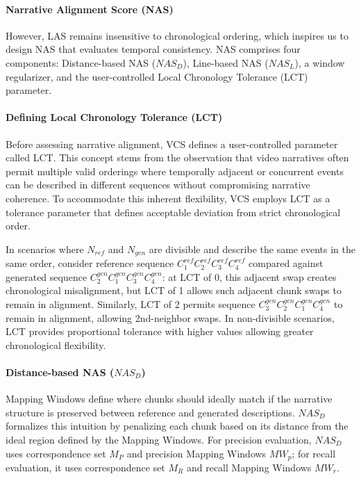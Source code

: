 \documentclass[letterpaper]{article} %
\begin{document}
\paragraph{Narrative Alignment Score (NAS)}
However, LAS remains insensitive to chronological ordering, which inspires us to design NAS that evaluates temporal consistency. NAS comprises four components: Distance-based NAS ($NAS_D$), Line-based NAS ($NAS_L$), a window regularizer, and the user-controlled Local Chronology Tolerance (LCT) parameter.

\paragraph{Defining Local Chronology Tolerance (LCT)}
Before assessing narrative alignment, VCS defines a user-controlled parameter called LCT. This concept stems from the observation that video narratives often permit multiple valid orderings where temporally adjacent or concurrent events can be described in different sequences without compromising narrative coherence. To accommodate this inherent flexibility, VCS employs LCT as a tolerance parameter that defines acceptable deviation from strict chronological order. 

In scenarios where $N_{ref}$ and $N_{gen}$ are divisible and describe the same events in the same order, consider reference sequence $C_1^{ref}C_2^{ref}C_3^{ref}C_4^{ref}$ compared against generated sequence $C_2^{gen}C_1^{gen}C_3^{gen}C_4^{gen}$: at LCT of 0, this adjacent swap creates chronological misalignment, but LCT of 1 allows such adjacent chunk swaps to remain in alignment. Similarly, LCT of 2 permits sequence $C_3^{gen}C_2^{gen}C_1^{gen}C_4^{gen}$ to remain in alignment, allowing 2nd-neighbor swaps. In non-divisible scenarios, LCT provides proportional tolerance with higher values allowing greater chronological flexibility.

\paragraph{Distance-based NAS ($NAS_D$)}
Mapping Windows define where chunks should ideally match if the narrative structure is preserved between reference and generated descriptions. $NAS_D$ formalizes this intuition by penalizing each chunk based on its distance from the ideal region defined by the Mapping Windows. For precision evaluation, $NAS_D$ uses correspondence set $M_P$ and precision Mapping Windows $MW_p$; for recall evaluation, it uses correspondence set $M_R$ and recall Mapping Windows $MW_r$.
\end{document}
